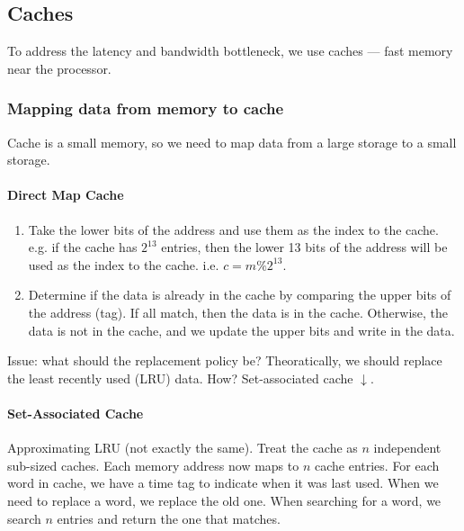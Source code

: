 \documentclass{../../ainote}
\begin{document}
\subsection{Caches}
To address the latency and bandwidth bottleneck, we use caches --- fast memory near the processor.

\subsubsection{Mapping data from memory to cache}
Cache is a small memory, so we need to map data from a large storage to a small storage. 

\paragraph{Direct Map Cache}\mbox\\
\begin{enumerate}[Step 1., leftmargin=4em]
    \item Take the lower bits of the address and use them as the index to the cache. e.g. if the cache has $2^{13}$ entries, then the lower 13 bits of the address will be used as the index to the cache. i.e. $c=m\%2^{13}$.
    \item Determine if the data is already in the cache by comparing the upper bits of the address (tag). If all match, then the data is in the cache. Otherwise, the data is not in the cache, and we update the upper bits and write in the data.
\end{enumerate}

Issue: what should the replacement policy be? Theoratically, we should replace the least recently used (LRU) data. How? Set-associated cache $\downarrow$.

\paragraph{Set-Associated Cache}\mbox\\
Approximating LRU (not exactly the same). Treat the cache as $n$ independent sub-sized caches. Each memory address now maps to $n$ cache entries. For each word in cache, we have a time tag to indicate when it was last used. When we need to replace a word, we replace the old one. When searching for a word, we search $n$ entries and return the one that matches.
\end{document}
